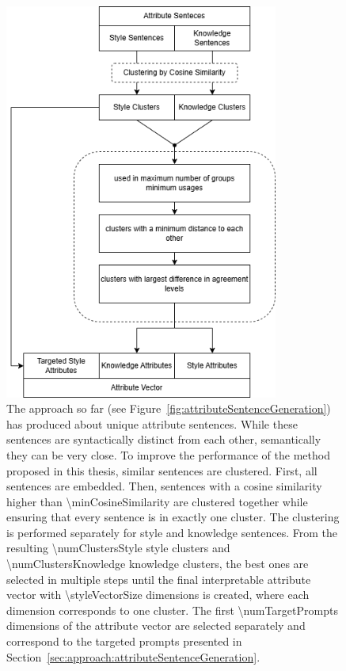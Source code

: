 \begin{figure}[h!t]
  \begin{center}
    \includegraphics[width=9cm]{figures/clustering_diagram.png}
  \end{center}
  \caption{The approach so far (see Figure~\ref{fig:attributeSentenceGeneration}) has produced about \numStyleSentencesText{} unique attribute sentences. While these sentences are syntactically distinct from each other, semantically they can be very close. To improve the performance of the method proposed in this thesis, similar sentences are clustered. First, all sentences are embedded. Then, sentences with a cosine similarity higher than \num{\minCosineSimilarity} are clustered together while ensuring that every sentence is in exactly one cluster. The clustering is performed separately for style and knowledge sentences. From the resulting \num{\numClustersStyle} style clusters and \num{\numClustersKnowledge} knowledge clusters, the best ones are selected in multiple steps until the final interpretable attribute vector with \num{\styleVectorSize} dimensions is created, where each dimension corresponds to one cluster. The first \num{\numTargetPrompts} dimensions of the attribute vector are selected separately and correspond to the targeted prompts presented in Section~\ref{sec:approach:attributeSentenceGeneration}.}%
  \label{fig:clustering}
\end{figure}

